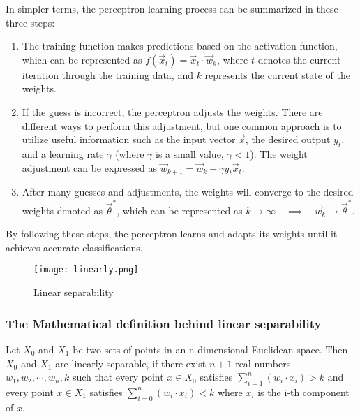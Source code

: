 In simpler terms, the perceptron learning process can be summarized in these three steps:
\begin{enumerate}
\item The training function makes predictions based on the activation function, which can be represented
  as $f(\vec{x}_t) = \vec{x}_t \cdot \vec{w}_k$, where $t$ denotes the current iteration through the training
  data, and $k$ represents the current state of the weights.

\item If the guess is incorrect, the perceptron adjusts the weights. There are different ways to perform this
  adjustment, but one common approach is to utilize useful information such as the input vector $\vec{x}$,
  the desired output $y_t$, and a learning rate $\gamma$ (where $\gamma$ is a small value, $\gamma < 1$).
  The weight adjustment can be expressed as $\vec{w}_{k+1} = \vec{w}_k + \gamma y_t \vec{x}_t$.

\item After many guesses and adjustments, the weights will converge to the desired weights denoted as
  $\vec{\theta}^*$, which can be represented as
  $k \rightarrow \infty \quad \implies \quad \vec{w}_k \rightarrow \vec{\theta}^*$.
\end{enumerate}

By following these steps, the perceptron learns and adapts its weights until it achieves accurate
classifications.

\begin{figure}[h]
  \centering
  \texttt{[image: linearly.png]}
  \caption{Linear separability}
\end{figure}
\subsubsection{The Mathematical definition behind linear separability}
Let $X_0$ and $X_1$ be two sets of points in an n-dimensional Euclidean space. Then $X_0$ and $X_1$
are linearly separable, if there exist $n + 1$ real numbers $w_1, w_2, \cdots, w_n, k$ such that
every point $x \in X_0$ satisfies $\sum_{i = 1}^{n}(w_i \cdot x_i) > k$ and every point $x \in X_1$
satisfies
$\sum_{i = 0}^{n}(w_i \cdot x_i) < k$ where $x_i$ is the i-th component of $x$.
